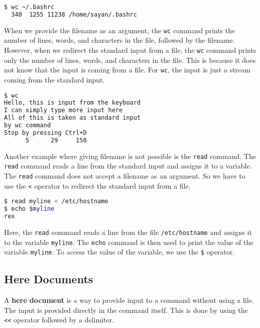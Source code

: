 \begin{lstlisting}[language=bash]
$ wc ~/.bashrc
  340  1255 11238 /home/sayan/.bashrc
\end{lstlisting}

When we provide the filename as an argument, the \lstinline|wc| command
prints the number of lines, words, and characters in the file, followed
by the filename. However, when we redirect the standard input from a
file, the \lstinline|wc| command prints only the number of lines, words,
and characters in the file. This is because it does not know that the
input is coming from a file. For \lstinline|wc|, the input is just a stream
coming from the standard input.

\begin{lstlisting}[language=bash]
$ wc
Hello, this is input from the keyboard
I can simply type more input here
All of this is taken as standard input
by wc command
Stop by pressing Ctrl+D
      5      29     150
\end{lstlisting}

Another example where giving filename is not possible is the \lstinline|read|
command. The \lstinline|read| command reads a line from the standard input
and assigns it to a variable. The \lstinline|read| command does not accept
a filename as an argument. So we have to use the \lstinline|<| operator to
redirect the standard input from a file.

\begin{lstlisting}[language=bash]
$ read myline < /etc/hostname
$ echo $myline
rex
\end{lstlisting}

Here, the \lstinline|read| command reads a line from the file \lstinline|/etc/hostname|
and assigns it to the variable \lstinline|myline|. The \lstinline|echo| command
is then used to print the value of the variable \lstinline|myline|.
To access the value of the variable, we use the \lstinline|$| operator.

\subsection{Here Documents}

A \textbf{here document} is a way to provide input to a command without
using a file. The input is provided directly in the command itself.
This is done by using the \lstinline|<<| operator followed by a delimiter.

